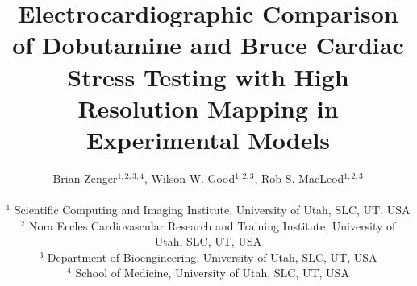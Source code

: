 \documentclass[twocolumn]{cinc}
\begin{document}
\title{Electrocardiographic Comparison of Dobutamine and Bruce Cardiac \\ Stress Testing with High Resolution Mapping in Experimental Models}


\author { Brian Zenger$^{1,2,3,4}$, Wilson W. Good$^{1,2,3}$, Rob S. MacLeod$^{1,2,3}$\\
\ \\ %
$^1$ Scientific Computing and Imaging Institute, University of Utah, SLC, UT, USA \\
$^2$  Nora Eccles Cardiovascular Research and Training Institute, University of Utah, SLC, UT, USA \\
$^3$ Department of Bioengineering, University of Utah, SLC, UT, USA \\
$^4$ School of Medicine, University of Utah, SLC, UT, USA }

\maketitle
\end{document}
